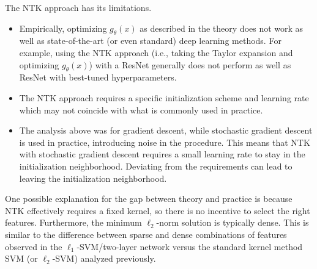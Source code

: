 The NTK approach has its limitations.
\begin{itemize}
    \item Empirically, optimizing $g_\theta(x)$ as described in the theory does not work as well as state-of-the-art (or even standard) deep learning methods. For example, using the NTK approach (i.e., taking the Taylor expansion and optimizing $g_{\theta}(x)$) with a ResNet generally does not perform as well as ResNet with best-tuned hyperparameters.
    
    \item The NTK approach requires a specific initialization scheme and learning rate which may not coincide with what is commonly used in practice.
    
    \item The analysis above was for gradient descent, while stochastic gradient descent is used in practice, introducing noise in the procedure. This means that NTK with stochastic gradient descent requires a small learning rate to stay in the initialization neighborhood. Deviating from the requirements can lead to leaving the initialization neighborhood.
\end{itemize}

One possible explanation for the gap between theory and practice is because NTK effectively requires a fixed kernel, so there is no incentive to select the right features. Furthermore, the minimum $\ell_2$-norm solution is typically dense. This is similar to the difference between sparse and dense combinations of features observed in the $\ell_1$-SVM/two-layer network versus the standard kernel method SVM (or $\ell_2$-SVM) analyzed previously.

